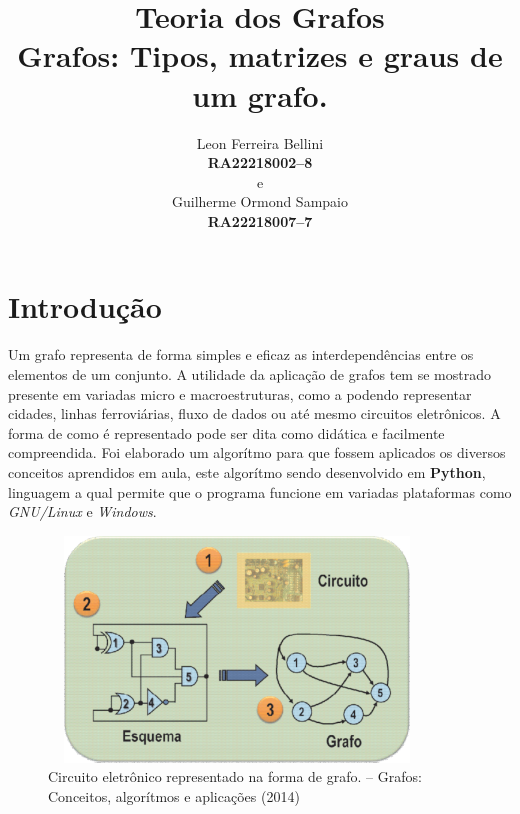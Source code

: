 \documentclass[a4paper, 12pt]{article}
\begin{document}
\title{\textbf{Teoria dos Grafos}\\ \small{Grafos: Tipos, matrizes e graus de um grafo.}}
\author{Leon Ferreira Bellini\\
	\small{\textbf{RA\@ 22218002--8}}\\
	e\\
   Guilherme Ormond Sampaio\\
   \small{\textbf{RA\@ 22218007--7}}
}
\date{}
\maketitle
\section{Introdução}
Um grafo representa de forma simples e eficaz as interdependências entre os elementos de um conjunto. A utilidade da aplicação de grafos tem se mostrado presente em variadas micro e macroestruturas, como a podendo representar cidades, linhas ferroviárias, fluxo de dados ou até mesmo circuitos eletrônicos. A forma de como é representado pode ser dita como didática e facilmente compreendida. Foi elaborado um algorítmo para que fossem aplicados os diversos conceitos aprendidos em aula, este algorítmo sendo desenvolvido em \textbf{Python}, linguagem a qual permite que o programa funcione em variadas plataformas como \textit{GNU/Linux} e \textit{Windows}. 

\begin{center}

	\begin{figure}[hbt]
		\centering
		\includegraphics[width=10cm, height= 6cm]{circuito.png}

	\caption[Figura 1]{Circuito eletrônico representado na forma de grafo. -- Grafos: Conceitos, algorítmos e aplicações (2014) }
	\end{figure}

\end{center}
\end{document}
